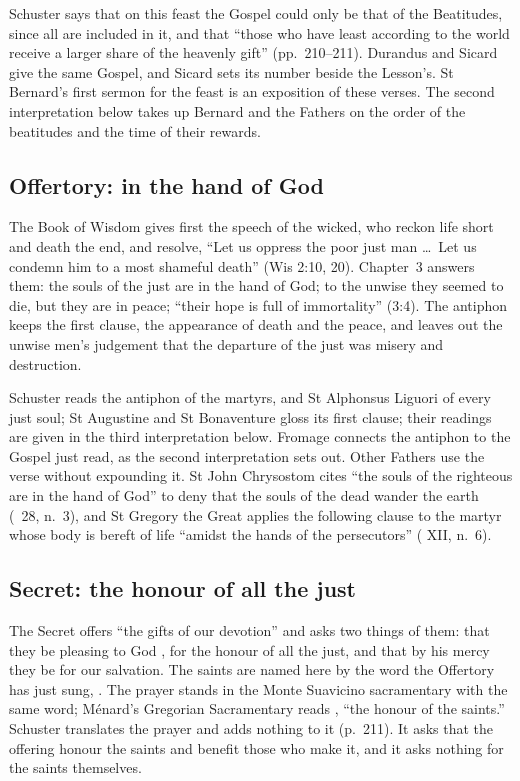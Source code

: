 Schuster says that on this feast the Gospel could only be that of the
Beatitudes, since all are included in it, and that ``those who have least
according to the world receive a larger share of the heavenly gift''
(pp.~210--211). Durandus and Sicard give the same Gospel, and Sicard sets its
number beside the Lesson's. St Bernard's first sermon for the feast is an
exposition of these verses. The second interpretation below takes up Bernard
and the Fathers on the order of the beatitudes and the time of their
rewards.

\subsection{Offertory: in the hand of God}
\label{sec:element-offertory}

The Book of Wisdom gives first the speech of the wicked, who reckon life short
and death the end, and resolve, ``Let us oppress the poor just man \dots\ Let
us condemn him to a most shameful death'' (Wis 2:10, 20). Chapter~3 answers
them: the souls of the just are in the hand of God; to the unwise they seemed
to die, but they are in peace; ``their hope is full of immortality'' (3:4).
The antiphon keeps the first clause, the appearance of death and the peace,
and leaves out the unwise men's judgement that the departure of the just was
misery and destruction.

Schuster reads the antiphon of the martyrs, and St Alphonsus Liguori of every
just soul; St Augustine and St Bonaventure gloss its first clause; their
readings are given in the third interpretation below. Fromage connects the
antiphon to the Gospel just read, as the second interpretation sets out.
Other Fathers use the verse without expounding it. St John
Chrysostom cites ``the souls of the righteous are in the hand of God'' to deny
that the souls of the dead wander the earth (\ 28, n.~3),
and St Gregory the Great applies the following clause to the martyr whose
body is bereft of life ``amidst the hands of the persecutors'' (
XII, n.~6).

\subsection{Secret: the honour of all the just}
\label{sec:element-secret}

The Secret offers ``the gifts of our devotion'' and asks two things of them:
that they be pleasing to God , for
the honour of all the just, and that by his mercy they be for our salvation.
The saints are named here by the word the Offertory has just sung,
. The prayer stands in the Monte Suavicino sacramentary with
the same word; Ménard's Gregorian Sacramentary reads ,
``the honour of the saints.'' Schuster translates the prayer and adds nothing to
it (p.~211). It asks that the offering honour the saints and benefit those who
make it, and it asks nothing for the saints themselves.


